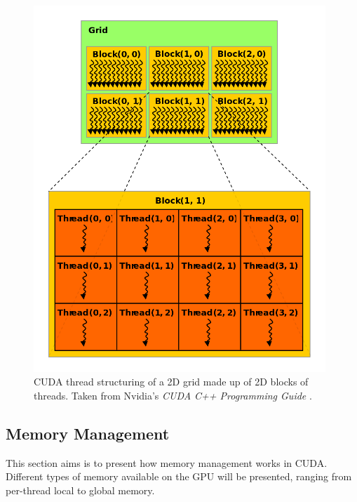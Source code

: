 \begin{figure}[ht!]
	\centering
	\includegraphics[width=11cm, keepaspectratio]{images/ch1/nvidia_grid_block_thread.png}
	\caption{CUDA thread structuring of a 2D grid made up of 2D blocks of threads. Taken from Nvidia's \emph{CUDA C++ Programming Guide} \cite{NVIDIAMay2022}.}
	\label{Figure:theory-CUDA-grid-block-thread}
\end{figure}


\subsection{Memory Management}\label{Subsection:memory-management}
This section aims is to present how memory management works in CUDA. Different types of memory available on the GPU will be presented, ranging from per-thread local to global memory.

